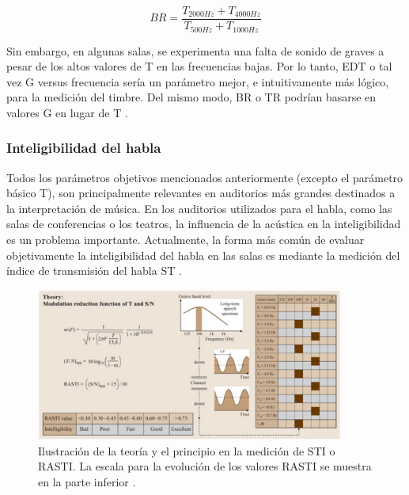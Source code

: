 \begin{equation}
BR = \frac{T_{2000Hz}+T_{4000Hz}}{T_{500Hz}+T_{1000Hz}}
\end{equation}

Sin embargo, en algunas salas, se experimenta una falta de sonido de graves a pesar de los altos valores de T en las frecuencias bajas. Por lo tanto, EDT o tal vez G versus frecuencia sería un parámetro mejor, e intuitivamente más lógico, para la medición del timbre. Del mismo modo, BR o TR podrían basarse en valores G en lugar de T \cite{Rossing2007}.

\subsubsection{Inteligibilidad del habla} Todos los parámetros objetivos mencionados anteriormente (excepto el parámetro básico T), son principalmente relevantes en auditorios más grandes destinados a la interpretación de música. En los auditorios utilizados para el habla, como las salas de conferencias o los teatros, la influencia de la acústica en la inteligibilidad es un problema importante. Actualmente, la forma más común de evaluar objetivamente la inteligibilidad del habla en las salas es mediante la medición del índice de transmisión del habla ST \cite{Rossing2007}.

\begin{figure}[!htb]
    \centering
    \includegraphics[width=0.9\textwidth]{imagenes/2.jpg}
    \caption{\footnotesize Ilustración de la teoría y el principio en la medición de STI o RASTI. La escala para la evolución de los valores RASTI se muestra en la parte inferior \cite{Rossing2007}.}
    \label{fig:IntelHabla}
\end{figure}
\FloatBarrier
